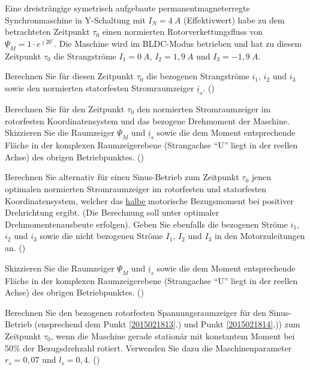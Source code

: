 \begin{question}[section=1,name={18.2.2015},mode=exm,type=bsp,tags={20150218}]
Eine dreisträngige symetrisch aufgebaute permanentmagneterregte Synchronmaschine in Y-Schaltung mit $I_N = 4~A$ (Effektivwert) habe zu dem betrachteten Zeitpunkt $\tau_0$ einen normierten Rotorverkettungsfluss von $\underline{\Psi}_M = 1 \cdot e^{\jmath 20 ^\circ}$. Die Maschine wird im BLDC-Modus betrieben und hat zu diesem Zeitpunkt $\tau_0$ die Strangströme $I_1 = 0~A$, $I_2 = 1,9~A$ und $I_3 = -1,9~A$.
\begin{compactenum}
\item Berechnen Sie für diesen Zeitpunkt $\tau_0$ die bezogenen Strangströme $i_1$, $i_2$ und $i_3$ sowie den normierten statorfesten Stromraumzeiger $\underline{i}_s$. ()
\item Berechnen Sie für den Zeitpunkt $\tau_0$ den normierten Stromraumzeiger im rotorfesten Koordinatensystem und das bezogene Drehmoment der Maschine. Skizzieren Sie die Raumzeiger $\underline{\Psi}_M$ und $\underline{i}_s$ sowie die dem Moment entsprechende Fläche in der komplexen Raumzeigerebene (Strangachse ``U'' liegt in der reellen Achse) des obrigen Betriebpunktes. ()
\item Berechnen Sie alternativ für einen Sinus-Betrieb zum Zeitpunkt $\tau_0$ jenen optimalen normierten Stromraumzeiger im rotorfesten und statorfesten Koordinatensystem, welcher das \underline{halbe} motorische Bezugsmoment bei positiver Drehrichtung ergibt. (Die Berechnung soll unter optimaler Drehmomentenausbeute erfolgen). Geben Sie ebenfalls die bezogenen Ströme $i_1$, $i_2$ und $i_3$ sowie die nicht bezogenen Ströme $I_1$, $I_2$ und $I_3$ in den Motorzuleitungen an. () \label{2015021813}
\item Skizzieren Sie die Raumzeiger $\underline{\Psi}_M$ und $\underline{i}_s$ sowie die dem Moment entsprechende Fläche in der komplexen Raumzeigerebene (Strangachse ``U'' liegt in der reellen Achse) des obrigen Betriebpunktes. ()\label{2015021814}
\item Berechnen Sie den bezogenen rotorfesten Spannungsraumzeiger für den Sinus-Betrieb (ensprechend dem Punkt \ref{2015021813}.) und Punkt \ref{2015021814}.)) zum Zeitpunkt $\tau_0$, wenn die Maschine gerade stationär mit konstantem Moment bei 50\% der Bezugsdrehzahl rotiert. Verwenden Sie dazu die Maschinenparameter $r_s = 0,07$ und $l_s= 0,4$. ()
\end{compactenum}
\end{question}
